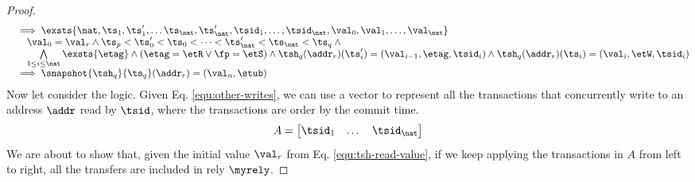 \begin{proof}
\begin{equation}
\begin{array}{@{}l@{}}
        \quad \implies \exsts{\nat, \ts_{1}, \ts_{1}', \dots \ts_{\nat}, \ts_{\nat}', \tsid_{1}, \dots, \tsid_{\nat}, \val_{0}, \val_{1}, \dots, \val_{\nat} }  \\
        \qquad \val_{0}  = \val_{r} 
        \land \ts_{p} < \ts_{0}' < \ts_{0} < \dots < \ts_{\nat}' < \ts_{\nat} < \ts_{q} \land {} \\
        \qquad \bigwedge\limits_{1 \leq i \leq \nat} 
        \exsts{ \etag } 
        \land ( \etag = \etR \lor \fp = \etS ) 
        \land \tsh_{q}(\addr_{r})(\ts_{i}') = (\val_{i-1}, \etag, \tsid_{i}) 
        \land \tsh_{q}(\addr_{r})(\ts_{i}) = (\val_{i}, \etW, \tsid_{i}) \\
        \quad \implies \snapshot{\tsh_{q}}{\ts_{q}}(\addr_{r}) = (\val_{n}, \stub)
    \end{array}
\end{equation}
Now let consider the logic.
Given Eq. \eqref{equ:other-writes}, we can use a vector to represent all the transactions that concurrently write to an address \( \addr \) read by \( \tsid \), where the transactions are order by the commit time.
\begin{equation}
\label{equ:con-trans-vector}
A = \left[
\begin{array}{@{} c c c @{}}
\tsid_{1} & \dots & \tsid_{\nat} \\
\end{array}
\right]
\end{equation}
We are about to show that, given the initial value \( \val_{r} \) from Eq. \eqref{equ:tsh-read-value}, if we keep applying the transactions in \( A \) from left to right, all the transfers are included in rely \( \myrely \).


\end{proof}












